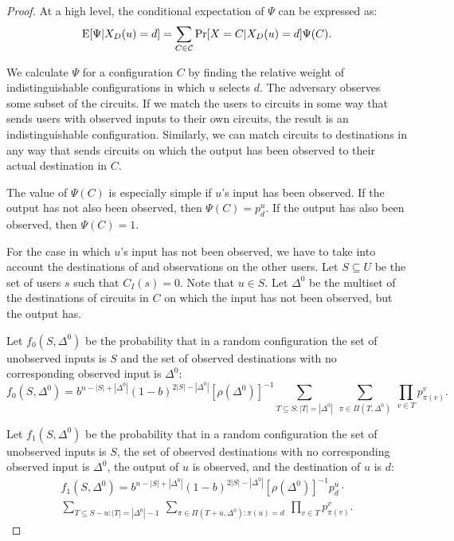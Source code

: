 \documentclass[prodmode,acmtissec]{acmsmall}
\begin{document}
\begin{proof}
At a high level, the conditional expectation of $\Psi$ can be expressed as:
\begin{equation*}
  \textnormal{E}[\Psi | X_D(u)=d] = \sum_{C\in \mathcal{C}} \textnormal{Pr}[X=C | X_D(u)=d] \Psi(C).
\end{equation*}

We calculate $\Psi$ for a configuration $C$ by finding the relative weight of indistinguishable configurations in which $u$ selects $d$.  The adversary observes some subset of the circuits.  If we match the users to circuits in some way that sends users with observed inputs to their own circuits, the result is an indistinguishable configuration.  Similarly, we can match circuits to destinations in any way that sends circuits on which the output has been observed to their actual destination in $C$.

The value of $\Psi(C)$ is especially simple if $u$'s input has been observed.  If the output has not also been observed, then $\Psi(C) = p^u_d$.  If the output has also been observed, then $\Psi(C) = 1$.

For the case in which $u$'s input has not been observed, we have to take into account the destinations of and observations on the other users.  Let $S\subseteq U$ be the set of users $s$ such that $C_I(s)=0$.  Note that $u\in S$.  Let $\Delta^0$ be the multiset of the destinations of circuits in $C$ on which the input has not been observed, but the output has.

Let $f_0(S,\Delta^0)$ be the probability that in a random configuration the set of unobserved inputs is $S$ and the set of observed destinations with no corresponding observed input is $\Delta^0$:
\begin{equation*}
f_0(S,\Delta^0) = b^{n-|S|+|\Delta^0|} (1-b)^{2|S|-|\Delta^0|} [\rho(\Delta^0)]^{-1} \sum_{T\subseteq S:|T|=|\Delta^0|} \ \sum_{\pi \in \Pi(T,\Delta^0)} \ \prod_{v\in T} p^v_{\pi(v)}.
\end{equation*}

Let $f_1(S,\Delta^0)$ be the probability that in a random configuration the set of unobserved inputs is $S$, the set of observed destinations with no corresponding observed input is $\Delta^0$, the output of $u$ is observed, and the destination of $u$ is $d$:
\begin{multline*}
f_1(S,\Delta^0) = b^{n-|S|+|\Delta^0|} (1-b)^{2|S|-|\Delta^0|} [\rho(\Delta^0)]^{-1} p^u_d \cdot \\
\sum_{T\subseteq S-u:|T|=|\Delta^0|-1} \ \sum_{\pi \in \Pi(T+u,\Delta^0) : \pi(u)=d} \ \prod_{v\in T} p^v_{\pi(v)}.
\end{multline*}


\end{proof}
\end{document}
